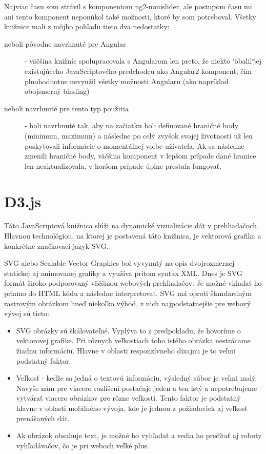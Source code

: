 \documentclass[
  digital, %
  twoside, %
  notable,   %
  nolof,   %
  nolot,   %
]{fithesis3}
\begin{document}
Najviac času som strávil s komponentom ng2-nouislider\cite{ng2nouislider}, ale postupom času mi ani tento komponent neponúkol také možnosti, ktoré by som potreboval. Všetky knižnice mali z môjho pohľadu tieto dva nedostatky:
\begin{description}
\item[neboli pôvodne navrhnuté pre Angular] - väčšina knižníc spolupracovala s Angularom len preto, že niekto \char`\"obalil\char`\" jej existujúceho JavaScriptového predchodcu ako Angular2 komponent, čím plnohodnotne nevyužil všetky možnosti Angularu (ako napríklad obojsmerný binding)
\item[neboli navrhnuté pre tento typ použitia] - boli navrhnuté tak, aby na začiatku boli definované hraničné body (minimum, maximum) a následne po celý zvyšok svojej životnosti už len poskytovali informácie o momentálnej voľbe užívateľa. Ak sa následne zmenili hraničné body, väčšina komponent v lepšom prípade dané hranice len neaktualizovala, v horšom prípade úplne prestala fungovať.
\end{description}

\section{D3.js}
Táto JavaScriptová knižnica slúži na dynamické vizualizácie dát v prehliadačoch. Hlavnou technológiou, na ktorej je postavená táto knižnica, je vektorová grafika a konkrétne značkovací jazyk SVG.

SVG alebo Scalable Vector Graphics bol vyvynutý na opis dvojrozmernej statickej aj animovanej grafiky a využíva pritom syntax XML\cite{quint2003scalable}.
Dnes je SVG formát široko podporovaný väčšinou webových prehliadačov. Je možné vkladať ho priamo do HTML kódu a následne interpretovať. SVG má oproti štandardným rastrovým obrázkom hneď niekoľko výhod, z nich najpodstatnejšie pre webový vývoj sú tieto:
\begin{itemize}
\item SVG obrázky sú škálovateľné. Vyplýva to z predpokladu, že hovoríme o vektorovej grafike. Pri rôznych veľkostiach toho istého obrázka nestrácame žiadnu informáciu. Hlavne v oblasti responzívneho dizajnu je to veľmi podstatný faktor.
\item Veľkosť - keďže sa jedná o textovú informáciu, výsledný súbor je veľmi malý. Navyše nám pre viacero rozlíšení postačuje jeden a ten istý a nepotrebujeme vytvárať viacero obrázkov pre rôzne veľkosti. Tento faktor je podstatný hlavne v oblasti mobilného vývoja, kde je jednou z požiadaviek aj veľkosť prenášaných dát.
\item Ak obrázok obsahuje text, je možné ho vyhľadať a vedia ho prečítať aj roboty vyhľadávačov, čo je pri weboch veľké plus.
\end{itemize}
\end{document}
